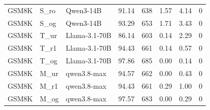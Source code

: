 \begin{table}[t]
\begin{tabular}{lllrrrrr}
GSM8K & S\_ro & Qwen3-14B & 91.14 & 638 & 1.57 & 4.14 & 0 \\
GSM8K & S\_og & Qwen3-14B & 93.29 & 653 & 1.71 & 3.43 & 0 \\
GSM8K & T\_ur & Llama-3.1-70B & 86.14 & 603 & 0.14 & 2.29 & 0 \\
GSM8K & T\_r1 & Llama-3.1-70B & 94.43 & 661 & 0.14 & 0.57 & 0 \\
GSM8K & T\_og & Llama-3.1-70B & 97.86 & 685 & 0.00 & 0.14 & 0 \\
GSM8K & M\_ur & qwen3.8-max & 94.57 & 662 & 0.00 & 0.43 & 0 \\
GSM8K & M\_r1 & qwen3.8-max & 94.43 & 661 & 0.29 & 1.00 & 0 \\
GSM8K & M\_og & qwen3.8-max & 97.57 & 683 & 0.00 & 0.29 & 0 \\
\bottomrule
\end{tabular}
\end{table}
